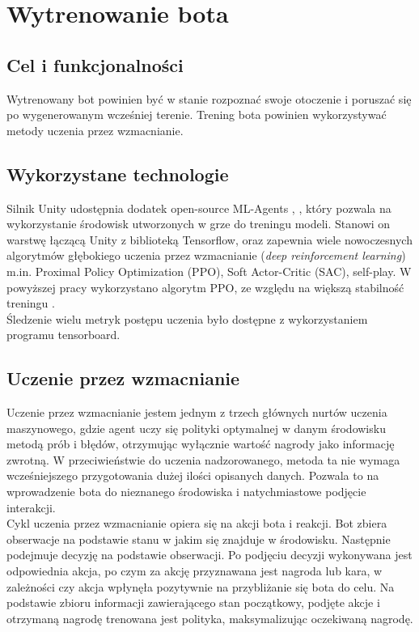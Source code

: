 \chapter{Wytrenowanie bota}
\thispagestyle{chapterBeginStyle}

\section{Cel i funkcjonalności}
Wytrenowany bot powinien być w stanie rozpoznać swoje otoczenie i poruszać się po wygenerowanym wcześniej terenie. Trening bota powinien wykorzystywać metody uczenia przez wzmacnianie.

\section{Wykorzystane technologie}
Silnik Unity udostępnia dodatek open-source ML-Agents \cite{UnityMlAgentsRepository}, \cite{UnityMlAgents}, który pozwala na wykorzystanie środowisk utworzonych w grze do treningu modeli. Stanowi on warstwę łączącą Unity z biblioteką Tensorflow, oraz zapewnia wiele nowoczesnych algorytmów głębokiego uczenia przez wzmacnianie (\textit{deep reinforcement learning}) m.in. Proximal Policy Optimization (PPO), Soft Actor-Critic (SAC), self-play. W powyższej pracy wykorzystano algorytm PPO, ze względu na większą stabilność treningu \cite{CompareDrlAlgorithms}. \\
Śledzenie wielu metryk postępu uczenia było dostępne z wykorzystaniem programu tensorboard.

\section{Uczenie przez wzmacnianie}
Uczenie przez wzmacnianie jestem jednym z trzech głównych nurtów uczenia maszynowego, gdzie agent uczy się polityki optymalnej w danym środowisku metodą prób i błędów, otrzymując wyłącznie wartość nagrody jako informację zwrotną. W przeciwieństwie do uczenia nadzorowanego, metoda ta nie wymaga wcześniejszego przygotowania dużej ilości opisanych danych. Pozwala to na wprowadzenie bota do nieznanego środowiska i natychmiastowe podjęcie interakcji.\\
Cykl uczenia przez wzmacnianie opiera się na akcji bota i reakcji. Bot zbiera obserwacje na podstawie stanu w jakim się znajduje w środowisku. Następnie podejmuje decyzję na podstawie obserwacji. Po podjęciu decyzji wykonywana jest odpowiednia akcja, po czym za akcję przyznawana jest nagroda lub kara, w zależności czy akcja wpłynęła pozytywnie na przybliżanie się bota do celu. Na podstawie zbioru informacji zawierającego stan początkowy, podjęte akcje i otrzymaną nagrodę trenowana jest polityka, maksymalizując oczekiwaną nagrodę.
\clearpage
